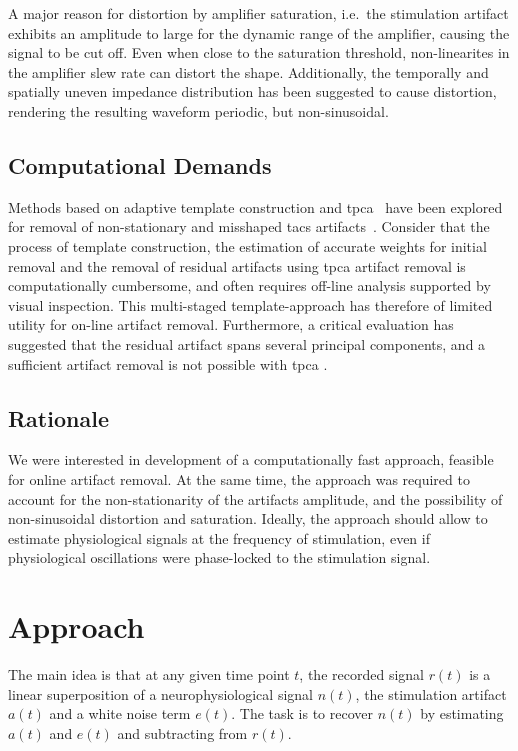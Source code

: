 \documentclass[a4paper]{article}
\begin{document}
A major reason for distortion by amplifier saturation, i.e.\ the stimulation artifact exhibits an amplitude to large for the dynamic range of the amplifier, causing the signal to be cut off. Even when close to the saturation threshold, non-linearites in the amplifier slew rate can distort the shape. Additionally, the temporally and spatially uneven impedance distribution has been suggested to cause distortion, rendering the resulting waveform periodic, but non-sinusoidal.

\subsection{Computational Demands}

Methods based on adaptive template construction and \gls{tpca}~\citep{Niazy_2005} have been explored for removal of  non-stationary and misshaped \gls{tacs} artifacts~\citep{Helfrich_2014}.  Consider that the process of template construction, the estimation of accurate weights for initial removal and the removal of residual artifacts using  \gls{tpca}  artifact removal is computationally cumbersome, and often requires off-line analysis supported by visual inspection.
This multi-staged template-approach has therefore of limited utility for on-line artifact removal. Furthermore, a critical evaluation has suggested that the residual artifact spans several principal components, and a sufficient artifact removal is not possible with \gls{tpca} \citep{Noury_2016}.

\subsection{Rationale}

We were interested in development of a computationally fast approach, feasible for online artifact removal. At the same time, the approach was required to account for the non-stationarity of the artifacts amplitude, and the possibility of non-sinusoidal distortion and saturation. Ideally, the approach should allow to estimate physiological signals at the frequency of stimulation, even if physiological oscillations were phase-locked to the stimulation signal.

\section{Approach}

The main idea is that at any given time point $t$, the recorded signal $r(t)$ is a linear superposition of a neurophysiological signal $n(t)$, the stimulation artifact $a(t)$ and a white noise term $e(t)$. The task is to recover $n(t)$ by estimating $a(t)$ and $e(t)$ and subtracting from $r(t)$.
\end{document}
